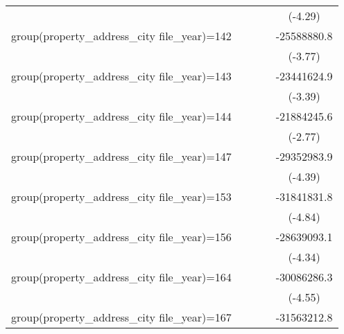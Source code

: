 {\begin{tabular}{l*{4}{c}}
                    &                     &                     &                     &     (-4.29)         \\
\addlinespace
group(property\_address\_city file\_year)=142&                     &                     &                     & -25588880.8\sym{***}\\
                    &                     &                     &                     &     (-3.77)         \\
\addlinespace
group(property\_address\_city file\_year)=143&                     &                     &                     & -23441624.9\sym{***}\\
                    &                     &                     &                     &     (-3.39)         \\
\addlinespace
group(property\_address\_city file\_year)=144&                     &                     &                     & -21884245.6\sym{**} \\
                    &                     &                     &                     &     (-2.77)         \\
\addlinespace
group(property\_address\_city file\_year)=147&                     &                     &                     & -29352983.9\sym{***}\\
                    &                     &                     &                     &     (-4.39)         \\
\addlinespace
group(property\_address\_city file\_year)=153&                     &                     &                     & -31841831.8\sym{***}\\
                    &                     &                     &                     &     (-4.84)         \\
\addlinespace
group(property\_address\_city file\_year)=156&                     &                     &                     & -28639093.1\sym{***}\\
                    &                     &                     &                     &     (-4.34)         \\
\addlinespace
group(property\_address\_city file\_year)=164&                     &                     &                     & -30086286.3\sym{***}\\
                    &                     &                     &                     &     (-4.55)         \\
\addlinespace
group(property\_address\_city file\_year)=167&                     &                     &                     & -31563212.8\sym{***}\\

\end{tabular}}

